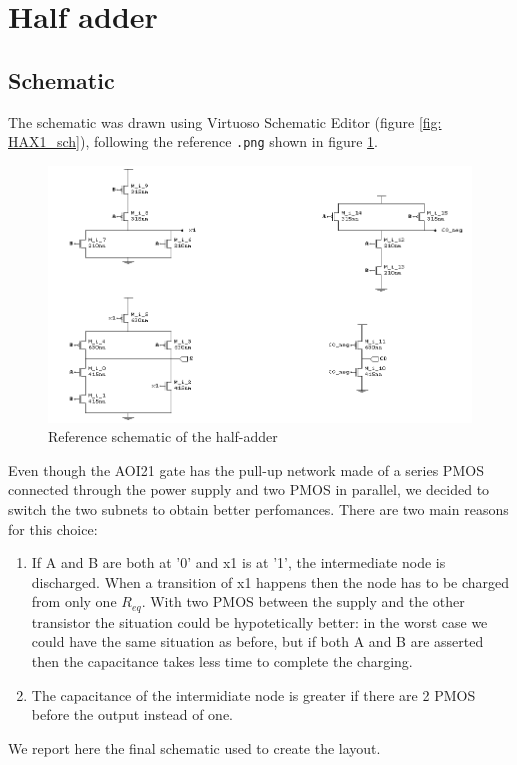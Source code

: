 \documentclass[a4paper]{article}
\begin{document}
\newpage
\section{Half adder}
\subsection{Schematic}
The schematic was drawn using Virtuoso Schematic Editor (figure \ref{fig: HAX1_sch}), following the reference \texttt{.png} shown in figure \ref{fig: HAX1_png}.

\begin{figure}[H]
	\includegraphics[width=0.9\linewidth]{./Images/HA/HA_X1.png}
	\caption{Reference schematic of the half-adder}
	\label{fig: HAX1_png}
\end{figure}

Even though the AOI21 gate has the pull-up network made of a series PMOS connected through the power supply and two PMOS in parallel, we decided to switch the two subnets to obtain better perfomances. There are two main reasons for this choice:
\begin{enumerate}
\item If A and B are both at '0' and x1 is at '1', the intermediate node is discharged. When a transition of x1 happens then the node has to be charged from only one $R_{eq}$. With two PMOS between the supply and the other transistor the situation could be hypotetically better: in the worst case we could have the same situation as before, but if both A and B are asserted then the capacitance takes less time to complete the charging.
\item The capacitance of the intermidiate node is greater if there are 2 PMOS before the output instead of one.
\end{enumerate}

We report here the final schematic used to create the layout.
\end{document}
